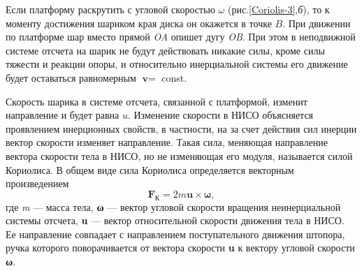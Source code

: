 \documentclass[14pt,a4paper,oneside]{extarticle}	%
\begin{document}
	Если платформу раскрутить с угловой скоростью $ \omega $ (рис.\ref{Coriolis-3},\textit{б}), то к моменту достижения шариком края диска он окажется в точке $ B $.
	При движении по платформе шар вместо прямой \textit{OA} опишет дугу \textit{OB}.
	При этом в неподвижной системе отсчета на шарик не будут действовать никакие силы, кроме силы тяжести и реакции опоры, и относительно инерциальной системы его движение будет оставаться равномерным  $ \textbf{v} = $ const.
	
	Скорость шарика в системе отсчета, связанной с платформой, изменит направление и будет равна $ u $. Изменение скорости в НИСО объясняется проявлением инерционных свойств, в частности, на за счет действия сил инерции вектор скорости изменяет направление.
	Такая сила, меняющая направление вектора скорости тела в НИСО, но не изменяющая его модуля, называется силой Кориолиса.
	В общем виде сила Кориолиса определяется векторным произведением
	\begin{equation}\label{Coriolis-1eq5}
	\textbf{F}_{\text{К}} = 2m\textbf{u}\times\textbf{ω},	
	\end{equation}	
	где \textit{m} — масса тела, \textbf{ω} — вектор угловой скорости вращения неинерциальной системы отсчета, \textbf{u} — вектор относительной скорости движения тела в НИСО.
	Ее направление совпадает с направлением поступательного движения штопора, ручка которого поворачивается от вектора скорости \textbf{u} к вектору угловой скорости \textbf{ω}. 
\end{document}
